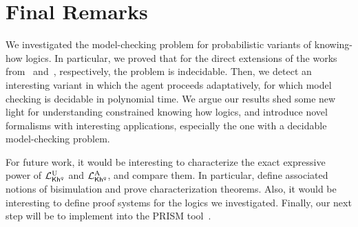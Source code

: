 \section{Final Remarks}
\label{sec:final}

We investigated the model-checking problem for probabilistic variants of knowing-how logics.
In particular, we proved that for the direct extensions of the works from~\cite{Wang15lori} and~\cite{AFSVQ21}, respectively, the problem is indecidable. Then, we detect an interesting variant in which the agent proceeds adaptatively, for which model checking is decidable in polynomial time. We argue our results shed some new light for understanding constrained knowing how logics, and introduce novel formalisms with interesting applications, especially the one with a decidable model-checking problem.

For future work, it would be interesting to characterize the exact expressive power of ${\mathcal{L}^{\mathrm{U}}_{{\mathsf{Kh}}^q}}$ and ${\mathcal{L}^{\mathrm{A}}_{{\mathsf{Kh}}^q}}$, and compare them. In particular, define associated notions of bisimulation and prove characterization theorems. Also, it would be interesting to define proof systems for the logics we investigated. Finally, our next step will be to implement  into the PRISM tool~\cite{KwiatkowskaNP11}.